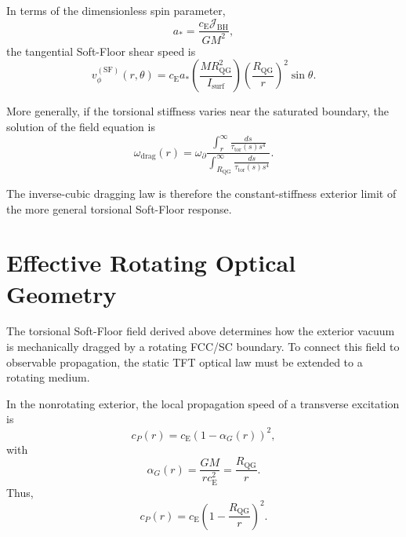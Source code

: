 In terms of the dimensionless spin parameter,
\begin{equation}
    a_\ast
    =
    \frac{c_{\mathrm{E}}\mathcal{J}_{\mathrm{BH}}}{GM^2},
\end{equation}
the tangential Soft-Floor shear speed is
\begin{equation}
    v_{\phi}^{(\mathrm{SF})}(r,\theta)
    =
    c_{\mathrm{E}}a_\ast
    \left(
    \frac{M R_{\mathrm{QG}}^2}{I_{\mathrm{surf}}}
    \right)
    \left(
    \frac{R_{\mathrm{QG}}}{r}
    \right)^2
    \sin\theta .
\end{equation}

More generally, if the torsional stiffness varies near the saturated boundary, the solution of the field equation is
\begin{equation}
    \omega_{\mathrm{drag}}(r)
    =
    \omega_{\partial}
    \frac{
    \displaystyle
    \int_r^\infty
    \frac{ds}{\tau_{\mathrm{tor}}(s)s^4}
    }{
    \displaystyle
    \int_{R_{\mathrm{QG}}}^{\infty}
    \frac{ds}{\tau_{\mathrm{tor}}(s)s^4}
    } .
\end{equation}

The inverse-cubic dragging law is therefore the constant-stiffness exterior limit of the more general torsional Soft-Floor response.

\section{Effective Rotating Optical Geometry}

The torsional Soft-Floor field derived above determines how the exterior vacuum is mechanically dragged by a rotating FCC/SC boundary. To connect this field to observable propagation, the static TFT optical law must be extended to a rotating medium.

In the nonrotating exterior, the local propagation speed of a transverse excitation is
\begin{equation}
    c_P(r)
    =
    c_{\mathrm{E}}
    \left(1-\alpha_G(r)\right)^2,
\end{equation}
with
\begin{equation}
    \alpha_G(r)
    =
    \frac{GM}{r c_{\mathrm{E}}^2}
    =
    \frac{R_{\mathrm{QG}}}{r} .
\end{equation}
Thus,
\begin{equation}
    c_P(r)
    =
    c_{\mathrm{E}}
    \left(
    1-
    \frac{R_{\mathrm{QG}}}{r}
    \right)^2 .
\end{equation}

